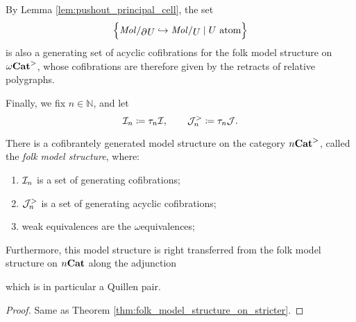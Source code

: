 \begin{rmk} 
    By Lemma \ref{lem:pushout_principal_cell}, the set
    \begin{equation*}
        \set{\molecin{\bd{}{}U} \incl \molecin{U} \mid U \text{ atom}}
    \end{equation*}
    is also a generating set of acyclic cofibrations for the folk model structure on \( {\omega\mathbf{Cat}}^> \), whose cofibrations are therefore given by the retracts of relative polygraphs.
\end{rmk}

\noindent Finally, we fix \( n \in \mathbb{N} \), and let
\begin{equation*}
    \mathcal{I}_n \coloneqq \tau_{n}\mathcal{I},\quad\quad \mathcal{J}^>_n \coloneqq \tau_{n}\mathcal{J}.
\end{equation*}

\begin{thm} \label{thm:folk_model_structure_on_stricter_n} 
    There is a cofibrantely generated model structure on the category \( {n\mathbf{Cat}}^> \), called the \emph{folk model structure}, where:
    \begin{enumerate}
        \item \( \mathcal{I}_n \) is a set of generating cofibrations;
        \item \( \mathcal{J}^>_n \) is a set of generating acyclic cofibrations;
        \item weak equivalences are the \( \omega \)\nbd equivalences;
    \end{enumerate}
    Furthermore, this model structure is right transferred from the folk model structure on \( {n\mathbf{Cat}} \) along the adjunction 
    \begin{center}
    \end{center}
    which is in particular a Quillen pair.
\end{thm}
\begin{proof}
    Same as Theorem \ref{thm:folk_model_structure_on_stricter}.
\end{proof}

